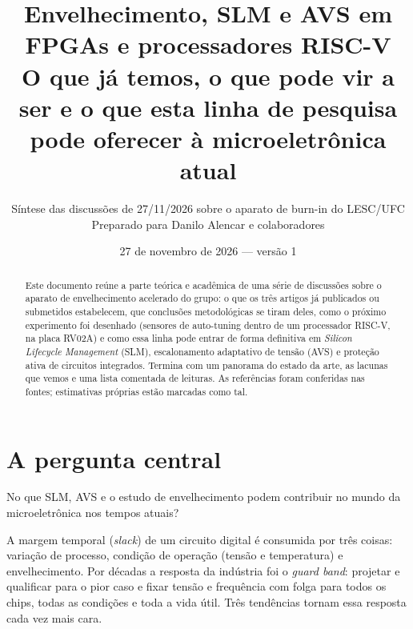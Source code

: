 \documentclass[11pt,a4paper]{article}
\title{\textbf{Envelhecimento, SLM e AVS em FPGAs e processadores RISC-V}\\[2pt]
\large O que já temos, o que pode vir a ser e o que esta linha de pesquisa\\ pode oferecer à microeletrônica atual}
\author{Síntese das discussões de 27/11/2026 sobre o aparato de burn-in do LESC/UFC\\
\small Preparado para Danilo Alencar e colaboradores}
\date{27 de novembro de 2026 --- versão 1}
\begin{document}
\maketitle

\begin{abstract}
\noindent Este documento reúne a parte teórica e acadêmica de uma série de discussões sobre o aparato de
envelhecimento acelerado do grupo: o que os três artigos já publicados ou submetidos estabelecem, que conclusões
metodológicas se tiram deles, como o próximo experimento foi desenhado (sensores de auto-tuning dentro de um
processador RISC-V, na placa RV02A) e como essa linha pode entrar de forma definitiva em
\emph{Silicon Lifecycle Management} (SLM), escalonamento adaptativo de tensão (AVS) e proteção ativa de circuitos
integrados. Termina com um panorama do estado da arte, as lacunas que vemos e uma lista comentada de leituras.
As referências foram conferidas nas fontes; estimativas próprias estão marcadas como tal.
\end{abstract}

\tableofcontents
\newpage

\section{A pergunta central}

\begin{nota}[Pergunta]
No que SLM, AVS e o estudo de envelhecimento podem contribuir no mundo da microeletrônica nos tempos atuais?
\end{nota}

A margem temporal (\emph{slack}) de um circuito digital é consumida por três coisas: variação de processo, condição
de operação (tensão e temperatura) e envelhecimento. Por décadas a resposta da indústria foi o \emph{guard band}: projetar
e qualificar para o pior caso e fixar tensão e frequência com folga para todos os chips, todas as condições e toda a vida
útil. Três tendências tornam essa resposta cada vez mais cara.
\end{document}
